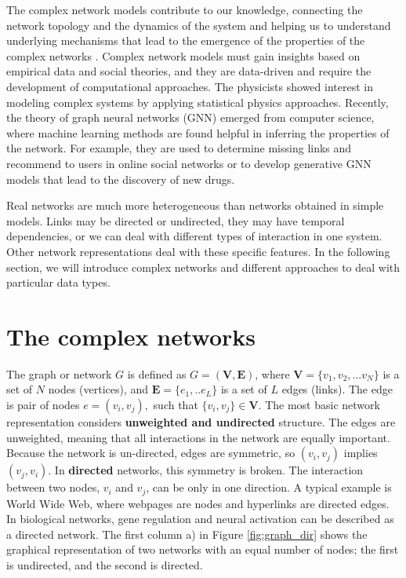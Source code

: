 The complex network models contribute to our knowledge, connecting the network topology and the dynamics of the system and helping us to understand underlying mechanisms that lead to the emergence of the properties of the complex networks \cite{barabasi1999, tadic2001, mitrovic2009, ghoshal2013uncovering}. Complex network models must gain insights based on empirical data and social theories, and they are data-driven and require the development of computational approaches. The physicists showed interest in modeling complex systems by applying statistical physics approaches. Recently, the theory of graph neural networks (GNN) emerged from computer science, where machine learning methods are found helpful in inferring the properties of the network. For example, they are used to determine missing links and recommend to users in online social networks or to develop generative GNN models that lead to the discovery of new drugs.  

Real networks are much more heterogeneous than networks obtained in simple models. Links may be directed or undirected, they may have temporal dependencies, or we can deal with different types of interaction in one system. Other network representations deal with these specific features. In the following section, we will introduce complex networks and different approaches to deal with particular data types. 

\newpage
\section{The complex networks}

The graph or network $G$ is defined as $G=(\boldsymbol{V}, \boldsymbol{E})$, where $\boldsymbol{V} = \{ v_1, v_2, ... v_N\}$ is a set of $N$ nodes (vertices), and  $\boldsymbol{E} = \{e_1, .. e_L\}$ is a set of $L$ edges (links). The edge is pair of nodes $e = (v_i, v_j), $ such that $\{v_i,v_j\}\in \boldsymbol{V}$. The most basic network representation considers \textbf{unweighted and undirected} structure. The edges are unweighted, meaning that all interactions in the network are equally important. Because the network is un-directed, edges are symmetric, so $(v_i, v_j)$ implies $(v_j, v_i)$. In \textbf{directed} networks, this symmetry is broken. The interaction between two nodes, $v_i$ and $v_j$, can be only in one direction. A typical example is World Wide Web, where webpages are nodes and hyperlinks are directed edges. In biological networks, gene regulation and neural activation can be described as a directed network. The first column a) in Figure \ref{fig:graph_dir} shows the graphical representation of two networks with an equal number of nodes; the first is undirected, and the second is directed. 

